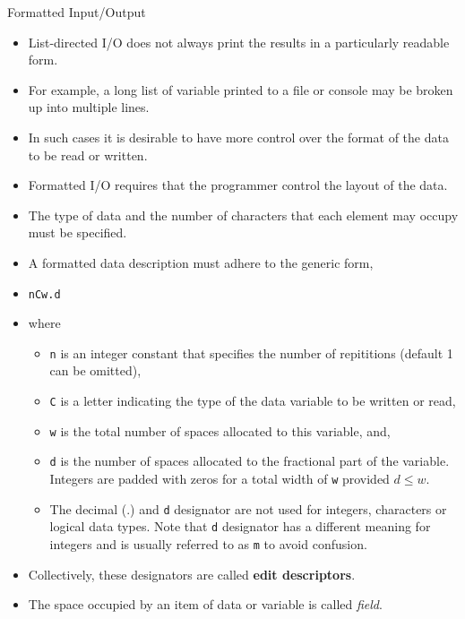 \documentclass[c,mathserif,compress,xcolor=svgnames]{beamer}
\newcommand{\lstfortran}[1]{\lstinline[language={[90]Fortran},basicstyle=\footnotesize\ttfamily]|#1|}
\begin{document}
\begin{frame}{Formatted Input/Output}
  \begin{itemize}
    \item List-directed I/O does not always print the results in a particularly readable form.
    \item For example, a long list of variable printed to a file or console may be broken up into multiple lines.
    \item In such cases it is desirable to have more control over the format of the data to be read or written.
    \item Formatted I/O requires that the programmer control the layout of the data.
    \item The type of data and the number of characters that each element may occupy must be specified.
      \framebreak
    \item A formatted data description must adhere to the generic form,
    \item[] \lstfortran{nCw.d}
    \item[] where
      \begin{itemize}
        \item \lstfortran{n} is an integer constant that specifies the number of repititions (default 1 can be omitted),
        \item \lstfortran{C} is a letter indicating the type of the data variable to be written or read,
        \item \lstfortran{w} is the total number of spaces allocated to this variable, and,
        \item \lstfortran{d} is the number of spaces allocated to the fractional part of the variable. Integers are padded with zeros for a total width of \lstfortran{w} provided $d\le w$.
        \item The decimal (.) and \lstfortran{d} designator are not used for integers, characters or logical data types. Note that \lstfortran{d} designator has a different meaning for integers and is usually referred to as \lstfortran{m} to avoid confusion.
      \end{itemize}
    \item Collectively, these designators are called \textbf{edit descriptors}.
    \item The space occupied by an item of data or variable is called \textit{field}.
  \end{itemize}
  \begin{minipage}{\textwidth}
    \begin{center}

\end{center}
\end{minipage}
\end{frame}
\end{document}
